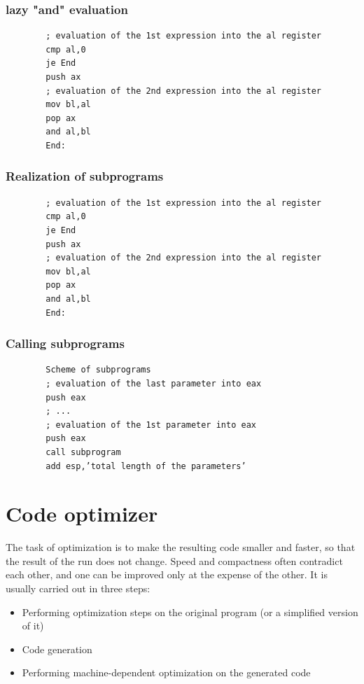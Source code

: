 \documentclass[margin=0px]{article}
\begin{document}
\subsubsection{ lazy "and" evaluation }

\begin{verbatim}
		; evaluation of the 1st expression into the al register
		cmp al,0
		je End
		push ax
		; evaluation of the 2nd expression into the al register
		mov bl,al
		pop ax
		and al,bl
		End:
	\end{verbatim}


\subsubsection{ Realization of subprograms }


\begin{verbatim}
		; evaluation of the 1st expression into the al register
		cmp al,0
		je End
		push ax
		; evaluation of the 2nd expression into the al register
		mov bl,al
		pop ax
		and al,bl
		End:
	\end{verbatim}

\subsubsection{ Calling subprograms }

\begin{verbatim}
		Scheme of subprograms
		; evaluation of the last parameter into eax
		push eax
		; ...
		; evaluation of the 1st parameter into eax
		push eax
		call subprogram
		add esp,’total length of the parameters’
	\end{verbatim}

\section{Code optimizer}

The task of optimization is to make the resulting code smaller and faster, so that the result of the run does not change. Speed and compactness often contradict each other, and one can be improved only at the expense of the other. It is usually carried out in three steps:

\begin{itemize}
    \item
          Performing optimization steps on the original program (or a simplified version of it)
    \item
          Code generation
    \item
          Performing machine-dependent optimization on the generated code
\end{itemize}
\end{document}
